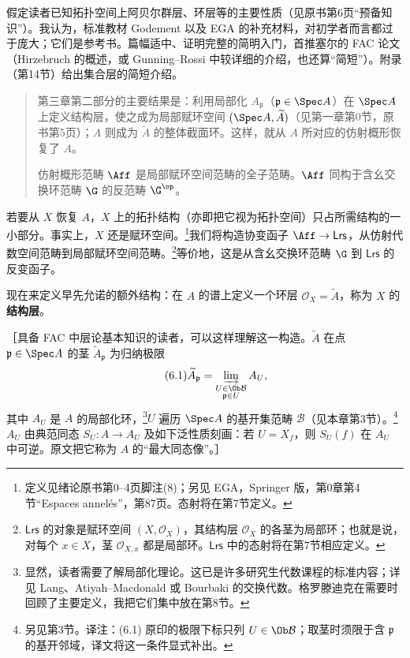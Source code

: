 假定读者已知拓扑空间上阿贝尔群层、环层等的主要性质（见原书第6页“预备知识”）。我认为，标准教材 Godement 以及 EGA 的补充材料，对初学者而言都过于庞大；它们是参考书。篇幅适中、证明完整的简明入门，首推塞尔的 FAC 论文（Hirzebruch 的概述，或 Gunning--Rossi 中较详细的介绍，也还算“简短”）。附录（第14节）给出集合层的简短介绍。
\begin{quote}
第三章第二部分的主要结果是：利用局部化 $A_{\mathfrak p}$（$\mathfrak p\in\Spec A$）在 $\Spec A$ 上定义结构层，使之成为局部赋环空间 $(\Spec A,\widetilde A)$（见第一章第0节，原书第5页）；$A$ 则成为 $\widetilde A$ 的整体截面环。这样，就从 $A$ 所对应的仿射概形恢复了 $A$。

仿射概形范畴 $\Aff$ 是局部赋环空间范畴的全子范畴。$\Aff$ 同构于含幺交换环范畴 $\G$ 的反范畴 $\G^{\op}$。
\end{quote}

若要从 $X$ 恢复 $A$，$X$ 上的拓扑结构（亦即把它视为拓扑空间）只占所需结构的一小部分。事实上，$X$ 还是赋环空间。\footnote{定义见绪论原书第0--4页脚注(8)；另见 EGA，Springer 版，第0章第4节“Espaces annel\'es”，第87页。态射将在第7节定义。}我们将构造协变函子 $\Aff\to\mathsf{Lrs}$，从仿射代数空间范畴到局部赋环空间范畴。\footnote{$\mathsf{Lrs}$ 的对象是赋环空间 $(X,\mathcal O_X)$，其结构层 $\mathcal O_X$ 的各茎为局部环；也就是说，对每个 $x\in X$，茎 $\mathcal O_{X,x}$ 都是局部环。$\mathsf{Lrs}$ 中的态射将在第7节相应定义。}等价地，这是从含幺交换环范畴 $\G$ 到 $\mathsf{Lrs}$ 的反变函子。

现在来定义早先允诺的额外结构：在 $A$ 的谱上定义一个环层 $\mathcal O_X=\widetilde A$，称为 $X$ 的\textbf{结构层}。

［具备 FAC 中层论基本知识的读者，可以这样理解这一构造。$\widetilde A$ 在点 $\mathfrak p\in\Spec A$ 的茎 $\widetilde A_{\mathfrak p}$ 为归纳极限
\begin{equation}\tag{6.1}
\widetilde A_{\mathfrak p}=\varinjlim_{\substack{U\in\Ob\mathcal B\\\mathfrak p\in U}}A_U,
\end{equation}
其中 $A_U$ 是 $A$ 的局部化环，\footnote{显然，读者需要了解局部化理论。这已是许多研究生代数课程的标准内容；详见 Lang、Atiyah--Macdonald 或 Bourbaki 的交换代数。格罗滕迪克在需要时回顾了主要定义，我把它们集中放在第8节。}$U$ 遍历 $\Spec A$ 的基开集范畴 $\mathcal B$（见本章第3节）。\footnote{另见第3节。译注：(6.1) 原印的极限下标只列 $U\in\Ob\mathcal B$；取茎时须限于含 $\mathfrak p$ 的基开邻域，译文将这一条件显式补出。}$A_U$ 由典范同态 $S_U:A\to A_U$ 及如下泛性质刻画：若 $U=X_f$，则 $S_U(f)$ 在 $A_U$ 中可逆。原文把它称为 $A$ 的“最大同态像”。］

